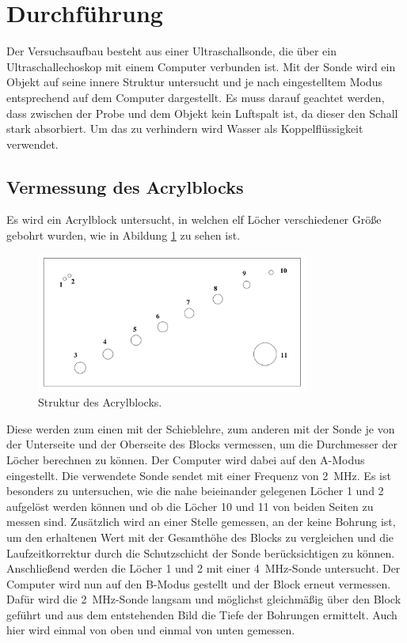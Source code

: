 \section{Durchführung}
\label{sec:Durchführung}
Der Versuchsaufbau besteht aus einer Ultraschallsonde, die über ein Ultraschallechoskop mit einem Computer verbunden ist.
Mit der Sonde wird ein Objekt auf seine innere Struktur untersucht und je nach eingestelltem Modus entsprechend auf dem Computer dargestellt.
Es muss darauf geachtet werden, dass zwischen der Probe und dem Objekt kein Luftspalt ist, da dieser den Schall stark absorbiert.
Um das zu verhindern wird Wasser als Koppelflüssigkeit verwendet.
\subsection{Vermessung des Acrylblocks}
Es wird ein Acrylblock untersucht, in welchen elf Löcher verschiedener Größe gebohrt wurden, wie in Abildung \ref{blockloch} zu sehen ist.
\begin{figure}[H]
    \centering
    \includegraphics[width=0.8\textwidth]{content/block.png}
    \caption{Struktur des Acrylblocks. \cite{us2}}
    \label{blockloch}
\end{figure}
\noindent
Diese werden zum einen mit der Schieblehre, zum anderen mit der Sonde je von der Unterseite und der Oberseite des Blocks vermessen, um die Durchmesser der Löcher berechnen zu können.
Der Computer wird dabei auf den A-Modus eingestellt.
Die verwendete Sonde sendet mit einer Frequenz von \SI{2}{\mega\hertz}.
Es ist besonders zu untersuchen, wie die nahe beieinander gelegenen Löcher 1 und 2 aufgelöst werden können und ob die Löcher 10 und 11 von beiden Seiten zu messen sind.
Zusätzlich wird an einer Stelle gemessen, an der keine Bohrung ist, um den erhaltenen Wert mit der Gesamthöhe des Blocks zu vergleichen und
die Laufzeitkorrektur durch die Schutzschicht der Sonde berücksichtigen zu können.
Anschließend werden die Löcher 1 und 2 mit einer \SI{4}{\mega\hertz}-Sonde untersucht.
Der Computer wird nun auf den B-Modus gestellt und der Block erneut vermessen.
Dafür wird die \SI{2}{\mega\hertz}-Sonde langsam und möglichst gleichmäßig über den Block geführt und aus dem entstehenden Bild die Tiefe der Bohrungen ermittelt.
Auch hier wird einmal von oben und einmal von unten gemessen.
